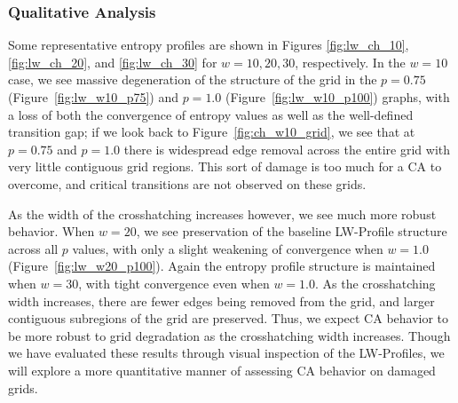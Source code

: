 \documentclass[a4paper,11pt]{report}
\begin{document}
\subsubsection*{Qualitative Analysis}

Some representative entropy profiles are shown in Figures \ref{fig:lw_ch_10}, \ref{fig:lw_ch_20}, and \ref{fig:lw_ch_30} for $w=10,20,30$, respectively. In the $w=10$ case, we see massive degeneration of the structure of the grid in the $p=0.75$ (Figure~\ref{fig:lw_w10_p75}) and $p=1.0$ (Figure~\ref{fig:lw_w10_p100}) graphs, with a loss of both the convergence of entropy values as well as the well-defined transition gap; if we look back to Figure~\ref{fig:ch_w10_grid}, we see that at $p=0.75$ and $p=1.0$ there is widespread edge removal across the entire grid with very little contiguous grid regions. This sort of damage is too much for a CA to overcome, and critical transitions are not observed on these grids. 

As the width of the crosshatching increases however, we see much more robust behavior. When $w=20$, we see preservation of the baseline LW-Profile structure across all $p$ values, with only a slight weakening of convergence when $w=1.0$ (Figure~\ref{fig:lw_w20_p100}). Again the entropy profile structure is maintained when $w=30$, with tight convergence even when $w=1.0$. As the crosshatching width increases, there are fewer edges being removed from the grid, and larger contiguous subregions of the grid are preserved. Thus, we expect CA behavior to be more robust to grid degradation as the crosshatching width increases. Though we have evaluated these results through visual inspection of the LW-Profiles, we will explore a more quantitative manner of assessing CA behavior on damaged grids.
\end{document}
